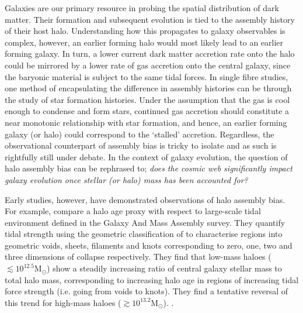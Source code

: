 Galaxies are our primary resource in probing the spatial distribution of dark matter. Their formation and subsequent evolution is tied to the assembly history of their host halo. Understanding how this propagates to galaxy observables is complex, however, an earlier forming halo would most likely lead to an earlier forming galaxy. In turn, a lower current dark matter accretion rate onto the halo could be mirrored by a lower rate of gas accretion onto the central galaxy, since the baryonic material is subject to the same tidal forces. In single fibre studies, one method of encapsulating the difference in assembly histories can be through the study of star formation histories. Under the assumption that the gas is cool enough to condense and form stars, continued gas accretion should constitute a near monotonic relationship with star formation, and hence, an earlier forming galaxy (or halo) could correspond to the `stalled' accretion. Regardless, the observational counterpart of assembly bias is tricky to isolate and as such is rightfully still under debate. In the context of galaxy evolution, the question of halo assembly bias can be rephrased to; \textit{does the cosmic web significantly impact galaxy evolution once stellar (or halo) mass has been accounted for?}

Early studies, however, have demonstrated observations of halo assembly bias. For example, \citet{tojeiro2017} compare a halo age proxy with respect to large-scale tidal environment defined in the Galaxy And Mass Assembly \citep[GAMA;][]{driver2009, driver2011} survey. They quantify tidal strength using the geometric classification of \citet{eardley2015} to characterise regions into geometric voids, sheets, filaments and knots corresponding to zero, one, two and three dimensions of collapse respectively. They find that low-mass haloes ($\lesssim 10^{12.5} \mathrm{M_{\odot}}$) show a steadily increasing ratio of central galaxy stellar mass to total halo mass, corresponding to increasing halo age in regions of increasing tidal force strength (i.e. going from voids to knots). They find a tentative reversal of this trend for high-mass haloes ($\gtrsim 10^{13.2} \mathrm{M_{\odot}}$). \citep[See][who explicitly look for changes in halo to stellar mass ratio with geometric environment using stacked lensing profiles, but find no significant changes when averaging over halo mass.]{brouwer2016}.

